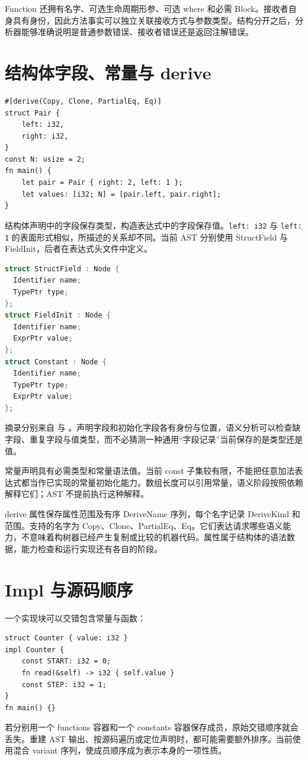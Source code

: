 Function 还拥有名字、可选生命周期形参、可选 where 和必需 Block。接收者自身具有身份，因此方法事实可以独立关联接收方式与参数类型。结构分开之后，分析器能够准确说明是普通参数错误、接收者错误还是返回注解错误。

\section{结构体字段、常量与 derive}
\begin{lstlisting}[language=Rustless]
#[derive(Copy, Clone, PartialEq, Eq)]
struct Pair {
    left: i32,
    right: i32,
}
const N: usize = 2;
fn main() {
    let pair = Pair { right: 2, left: 1 };
    let values: [i32; N] = [pair.left, pair.right];
}
\end{lstlisting}
结构体声明中的字段保存类型，构造表达式中的字段保存值。\texttt{left: i32} 与 \texttt{left: 1} 的表面形式相似，所描述的关系却不同。当前 AST 分别使用 StructField 与 FieldInit，后者在表达式头文件中定义。
\begin{lstlisting}[language=C++]
struct StructField : Node {
  Identifier name;
  TypePtr type;
};
struct FieldInit : Node {
  Identifier name;
  ExprPtr value;
};
struct Constant : Node {
  Identifier name;
  TypePtr type;
  ExprPtr value;
};
\end{lstlisting}
摘录分别来自  与 。声明字段和初始化字段各有身份与位置，语义分析可以检查缺字段、重复字段与值类型，而不必猜测一种通用“字段记录”当前保存的是类型还是值。

常量声明具有必需类型和常量语法值。当前 const 子集较有限，不能把任意加法表达式都当作已实现的常量初始化能力。数组长度可以引用常量，语义阶段按照依赖解释它们；AST 不提前执行这种解释。

derive 属性保存属性范围及有序 DeriveName 序列，每个名字记录 DeriveKind 和范围。支持的名字为 Copy、Clone、PartialEq、Eq。它们表达请求哪些语义能力，不意味着构树器已经产生复制或比较的机器代码。属性属于结构体的语法数据，能力检查和运行实现还有各自的阶段。

\section{Impl 与源码顺序}
一个实现块可以交错包含常量与函数：
\begin{lstlisting}[language=Rustless]
struct Counter { value: i32 }
impl Counter {
    const START: i32 = 0;
    fn read(&self) -> i32 { self.value }
    const STEP: i32 = 1;
}
fn main() {}
\end{lstlisting}
若分别用一个 functions 容器和一个 constants 容器保存成员，原始交错顺序就会丢失。重建 AST 输出、按源码遍历或定位声明时，都可能需要额外排序。当前使用混合 variant 序列，使成员顺序成为表示本身的一项性质。

